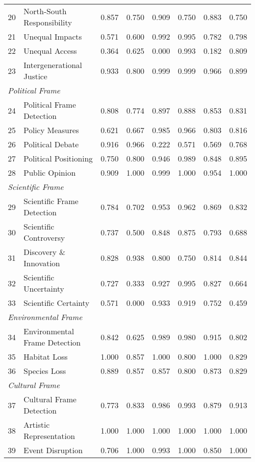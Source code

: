 \documentclass[12pt]{article}
\begin{document}
{\begin{longtable}{p{0.4cm}p{5.5cm}rrrrrr}
20 & North-South Responsibility & 0.857 & 0.750 & 0.909 & 0.750 & 0.883 & 0.750 \\
21 & Unequal Impacts & 0.571 & 0.600 & 0.992 & 0.995 & 0.782 & 0.798 \\
22 & Unequal Access & 0.364 & 0.625 & 0.000 & 0.993 & 0.182 & 0.809 \\
23 & Intergenerational Justice & 0.933 & 0.800 & 0.999 & 0.999 & 0.966 & 0.899 \\
\multicolumn{8}{l}{\textit{Political Frame}} \\
24 & Political Frame Detection & 0.808 & 0.774 & 0.897 & 0.888 & 0.853 & 0.831 \\
25 & Policy Measures & 0.621 & 0.667 & 0.985 & 0.966 & 0.803 & 0.816 \\
26 & Political Debate & 0.916 & 0.966 & 0.222 & 0.571 & 0.569 & 0.768 \\
27 & Political Positioning & 0.750 & 0.800 & 0.946 & 0.989 & 0.848 & 0.895 \\
28 & Public Opinion & 0.909 & 1.000 & 0.999 & 1.000 & 0.954 & 1.000 \\
\multicolumn{8}{l}{\textit{Scientific Frame}} \\
29 & Scientific Frame Detection & 0.784 & 0.702 & 0.953 & 0.962 & 0.869 & 0.832 \\
30 & Scientific Controversy & 0.737 & 0.500 & 0.848 & 0.875 & 0.793 & 0.688 \\
31 & Discovery \& Innovation & 0.828 & 0.938 & 0.800 & 0.750 & 0.814 & 0.844 \\
32 & Scientific Uncertainty & 0.727 & 0.333 & 0.927 & 0.995 & 0.827 & 0.664 \\
33 & Scientific Certainty & 0.571 & 0.000 & 0.933 & 0.919 & 0.752 & 0.459 \\
\multicolumn{8}{l}{\textit{Environmental Frame}} \\
34 & Environmental Frame Detection & 0.842 & 0.625 & 0.989 & 0.980 & 0.915 & 0.802 \\
35 & Habitat Loss & 1.000 & 0.857 & 1.000 & 0.800 & 1.000 & 0.829 \\
36 & Species Loss & 0.889 & 0.857 & 0.857 & 0.800 & 0.873 & 0.829 \\
\multicolumn{8}{l}{\textit{Cultural Frame}} \\
37 & Cultural Frame Detection & 0.773 & 0.833 & 0.986 & 0.993 & 0.879 & 0.913 \\
38 & Artistic Representation & 1.000 & 1.000 & 1.000 & 1.000 & 1.000 & 1.000 \\
39 & Event Disruption & 0.706 & 1.000 & 0.993 & 1.000 & 0.850 & 1.000 \\

\end{longtable}}
\end{document}
